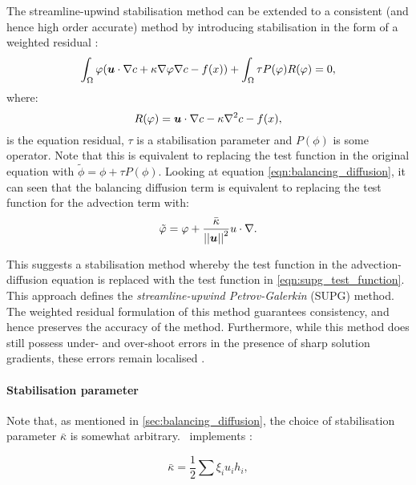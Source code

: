 The streamline-upwind stabilisation method can be extended to a consistent (and
hence high order accurate) method by introducing stabilisation in the form of a weighted
residual \citep{DoneaBook}:
\begin{equation*}
  \int_\Omega \varphi ({\mbox{\boldmath$u$}} \cdot \nabla c + \kappa \nabla \varphi \nabla c - f(x)) +
  \int_\Omega \tau P(\varphi) R(\varphi)
  = 0,
\end{equation*}
where:
\begin{equation*}
  R(\varphi) = {\mbox{\boldmath$u$}} \cdot \nabla c - \kappa \nabla^2 c - f(x),
\end{equation*}
is the equation residual, $\tau$ is a stabilisation parameter and $P(\phi)$ is
some operator.
Note that this is equivalent to replacing the test function in the original
equation with $\tilde{\phi} = \phi + \tau P(\phi)$.
Looking at equation \eqref{eqn:balancing_diffusion}, it can seen that the
balancing diffusion term is equivalent to replacing the test function for the
advection term with:
\begin{equation}\label{eqn:supg_test_function}
  \tilde{\varphi} = \varphi + \frac{\bar{\kappa}}{\left|\left| {\mbox{\boldmath$u$}} \right|\right|^2} u \cdot \nabla.
\end{equation}

This suggests a stabilisation method whereby the test function in the advection-diffusion
equation is replaced with the test function in \eqref{eqn:supg_test_function}.
This approach defines the \textit{streamline-upwind Petrov-Galerkin} (SUPG) method. The
weighted residual formulation of this method guarantees consistency, and hence
preserves the accuracy of the method. Furthermore, while this method does
still possess under- and over-shoot errors in the presence of sharp solution
gradients, these errors remain localised \citep{hughes1987}.

\paragraph{Stabilisation parameter}\label{sec:stabilisation_parameter}

Note that, as mentioned in \ref{sec:balancing_diffusion}, the choice of
stabilisation parameter $\bar{\kappa}$ is somewhat arbitrary. \fluidity\ implements \citep{brooks1982, DoneaBook}:

\begin{equation}\label{eqn:md_nu_bar}
  \bar{\kappa} = \frac{1}{2} \sum{\xi_i u_i h_i},
\end{equation}

